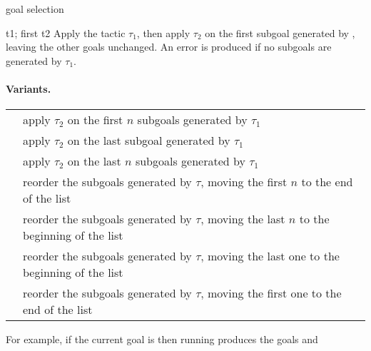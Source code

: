 \begin{tactic}{goal selection}
  \begin{tsyntax}[empty]{t1; first t2}
    Apply the tactic $\tau_1$, then apply $\tau_2$ on the first
    subgoal generated by , leaving the other goals unchanged.
    An error is produced if no subgoals are generated by $\tau_1$.

  \paragraph{Variants.}\strut

  \noindent\begin{tabularx}{\textwidth}{@{}ll@{}}
    {\ec{$\tau_1$; first $\;n$ $\;\tau_2$}} & apply $\tau_2$ on the
    first $n$ subgoals generated by $\tau_1$\\[.4cm]
    {\ec{$\tau_1$; last $\;\tau_2$}} & apply $\tau_2$ on the last subgoal
    generated by $\tau_1$\\[.4cm]
    {\ec{$\tau_1$; last $\;n$ $\;\tau_2$}} & apply $\tau_2$ on the last $n$
    subgoals generated by $\tau_1$\\[.4cm]
    {\ec{$\tau$; first $\;n\!$ last}} & \parbox{250pt}{reorder the subgoals
      generated by $\tau$, moving the first $n$ to the end of the
      list} \\[.4cm]
    {} & \parbox{250pt}{reorder the subgoals
      generated by $\tau$, moving the last $n$ to the beginning of the
      list} \\[.4cm]
    {} & \parbox{250pt}{reorder the subgoals generated
    by $\tau$, moving the last one to the beginning of the list}\\[.4cm]
    {} & \parbox{250pt}{reorder the subgoals
     generated by $\tau$, moving the first one to the end of the list}
  \end{tabularx}

  \bigskip
  For example, if the current goal is
   then
  running 
  produces the goals
  and
  \end{tsyntax}
\end{tactic}

